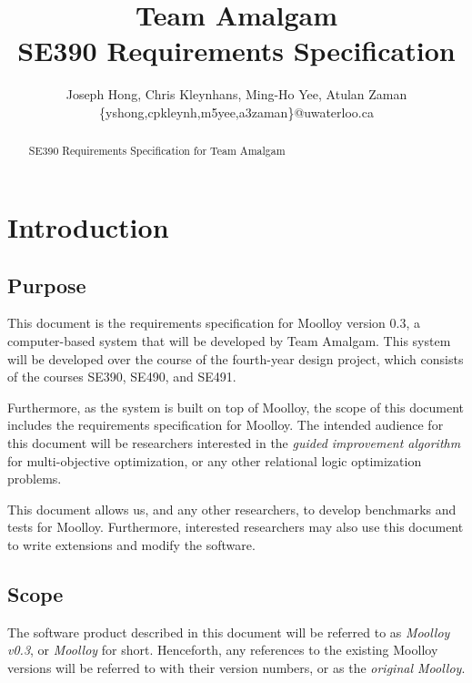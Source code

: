 \documentclass[11pt]{article}
\title{{\Large Team Amalgam} \\ SE390 Requirements Specification}
\author{Joseph Hong, Chris Kleynhans, Ming-Ho Yee, Atulan Zaman \\
        \{yshong,cpkleynh,m5yee,a3zaman\}@uwaterloo.ca}
\theoremstyle{definition}
\begin{document}
\maketitle

\begin{abstract}
SE390 Requirements Specification for Team Amalgam
\end{abstract}

\tableofcontents
\newpage

\section{Introduction}
\subsection{Purpose}

This document is the requirements specification for Moolloy version
0.3, a computer-based system that will be developed by Team Amalgam.
This system will be developed over the course of the fourth-year design
project, which consists of the courses SE390, SE490, and SE491.

Furthermore, as the system is built on top of Moolloy, the scope of
this document includes the requirements specification for Moolloy.
The intended audience for this document will be researchers interested
in the \textit{guided improvement algorithm} for multi-objective
optimization, or any other relational logic optimization problems.

This document allows us, and any other researchers, to develop
benchmarks and tests for Moolloy. Furthermore, interested researchers
may also use this document to write extensions and modify the software.

\subsection{Scope}

The software product described in this document will be referred to as
\textit{Moolloy v0.3}, or \textit{Moolloy} for short. Henceforth, any
references to the existing Moolloy versions will be referred to with
their version numbers, or as the \textit{original Moolloy}.
\end{document}
